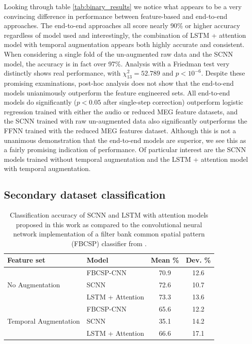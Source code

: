 \documentclass[fleqn,10pt]{wlscirep}
\begin{document}
Looking through table \ref{tab:binary_results} we notice what appears to be a very convincing difference in performance between feature-based and end-to-end approaches. The end-to-end approaches all score nearly 90\% or higher accuracy regardless of model used and interestingly, the combination of LSTM + attention model with temporal augmentation appears both highly accurate and consistent. When considering a single fold of the un-augmented raw data and the SCNN model, the accuracy is in fact over 97\%. Analysis with a Friedman test very distinctly shows real performance, with $\chi^2_{13}=52.789$ and $p<10^{-6}$. Despite these promising examinations, post-hoc analysis does not show that the end-to-end models unianimously outperform the feature engineered sets. All end-to-end models do significantly ($p<0.05$ after single-step correction) outperform logistic regression trained with either the audio or reduced MEG feature datasets, and the SCNN trained with raw un-augmented data also significantly outperforms the FFNN trained with the reduced MEG features dataset. Although this is not a unanimous demonstration that the end-to-end models are superior, we see this as a fairly promising indication of performance. Of particular interest are the SCNN models trained without temporal augmentation and the LSTM + attention model with temporal augmentation.


\subsection*{Secondary dataset classification}

\begin{table}[t]
  \caption{Classification accuracy of SCNN and LSTM with attention models proposed in this work as compared to the convolutional neural network implementation of a filter bank common spatial pattern (FBCSP) classifier from \cite{Schirrmeister2017}.}
  \centering
  \begin{tabular}{l l | c | c}
    \toprule
    \textbf{Feature set} & \textbf{Model} & \textbf{Mean \%} & \textbf{Dev. \%} \\
    \toprule
    \multirow{3}{*}{No Augmentation}
                         & FBCSP-CNN           & 70.9 & 12.6  \\
                         & SCNN                & 72.6 & 10.7  \\
                         & LSTM + Attention    & 73.3 & 13.6  \\ 
    \midrule
    \multirow{3}{*}{Temporal Augmentation}
                         & FBCSP-CNN           & 65.6 & 12.2  \\
                         & SCNN                & 35.1 & 14.2  \\
                         & LSTM + Attention    & 66.6 & 17.1  \\ 
    \bottomrule
  \end{tabular}
  \label{tab:sec_results}
\end{table}
\end{document}
